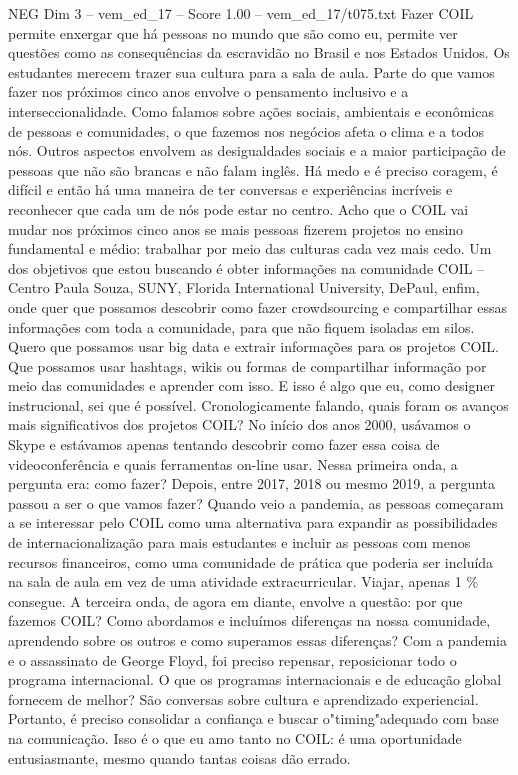 \begin{textsample}{NEG Dim 3 – vem\_ed\_17 – Score 1.00 – vem\_ed\_17/t075.txt}  \label{ex:f3_neg_034}
Fazer COIL permite enxergar que há pessoas no mundo que são como eu, permite ver questões como as consequências da escravidão no Brasil e nos Estados Unidos.
Os estudantes merecem trazer sua cultura para a sala de aula.
Parte do que vamos fazer nos próximos cinco anos envolve o pensamento inclusivo e a interseccionalidade.
Como falamos sobre ações sociais, ambientais e econômicas de pessoas e comunidades, o que fazemos nos negócios afeta o clima e a todos nós.
Outros aspectos envolvem as desigualdades sociais e a maior participação de pessoas que não são brancas e não falam inglês.
Há medo e é preciso coragem, é difícil e então há uma maneira de ter conversas e experiências incríveis e reconhecer que cada um de nós pode estar no centro.
Acho que o COIL vai mudar nos próximos cinco anos se mais pessoas fizerem projetos no ensino fundamental e médio: trabalhar por meio das culturas cada vez mais cedo.
Um dos objetivos que estou buscando é obter informações na comunidade COIL – Centro Paula Souza, SUNY, Florida International University, DePaul, enfim, onde quer que possamos descobrir como fazer crowdsourcing e compartilhar essas informações com toda a comunidade, para que não fiquem isoladas em silos.
Quero que possamos usar big data e extrair informações para os projetos COIL.
Que possamos usar hashtags, wikis ou formas de compartilhar informação por meio das comunidades e aprender com isso.
E isso é algo que eu, como designer instrucional, sei que é possível.
Cronologicamente falando, quais foram os avanços mais significativos dos projetos COIL?
No início dos anos 2000, usávamos o Skype e estávamos apenas tentando descobrir como fazer essa coisa de videoconferência e quais ferramentas on-line usar.
Nessa primeira onda, a pergunta era: como fazer?
Depois, entre 2017, 2018 ou mesmo 2019, a pergunta passou a ser o que vamos fazer?
Quando veio a pandemia, as pessoas começaram a se interessar pelo COIL como uma alternativa para expandir as possibilidades de internacionalização para mais estudantes e incluir as pessoas com menos recursos financeiros, como uma comunidade de prática que poderia ser incluída na sala de aula em vez de uma atividade extracurricular.
Viajar, apenas 1 \% consegue.
A terceira onda, de agora em diante, envolve a questão: por que fazemos COIL?
Como abordamos e incluímos diferenças na nossa comunidade, aprendendo sobre os outros e como superamos essas diferenças?
Com a pandemia e o assassinato de George Floyd, foi preciso repensar, reposicionar todo o programa internacional.
O que os programas internacionais e de educação global fornecem de melhor?
São conversas sobre cultura e aprendizado experiencial.
Portanto, é preciso consolidar a confiança e buscar o"timing"adequado com base na comunicação.
Isso é o que eu amo tanto no COIL: é uma oportunidade entusiasmante, mesmo quando tantas coisas dão errado.

\end{textsample}
